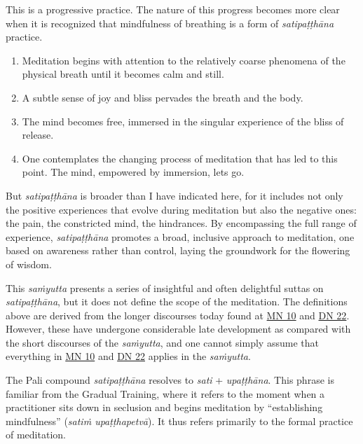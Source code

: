 \documentclass[12pt,openany]{book}%
\begin{document}
This is a progressive practice. The nature of this progress becomes more clear when it is recognized that mindfulness of breathing is a form of \textit{\textsanskrit{satipaṭṭhāna}} practice.

\begin{enumerate}%
\item Meditation begins with attention to the relatively coarse phenomena of the physical breath until it becomes calm and still.%
\item A subtle sense of joy and bliss pervades the breath and the body.%
\item The mind becomes free, immersed in the singular experience of the bliss of release.%
\item One contemplates the changing process of meditation that has led to this point. The mind, empowered by immersion, lets go.%
\end{enumerate}

But \textit{\textsanskrit{satipaṭṭhāna}} is broader than I have indicated here, for it includes not only the positive experiences that evolve during meditation but also the negative ones: the pain, the constricted mind, the hindrances. By encompassing the full range of experience, \textit{\textsanskrit{satipaṭṭhāna}} promotes a broad, inclusive approach to meditation, one based on awareness rather than control, laying the groundwork for the flowering of wisdom.

This \textit{\textsanskrit{saṁyutta}} presents a series of insightful and often delightful suttas on \textit{\textsanskrit{satipaṭṭhāna}}, but it does not define the scope of the meditation. The definitions above are derived from the longer discourses today found at \href{https://suttacentral.net/mn10}{MN 10} and \href{https://suttacentral.net/dn22}{DN 22}. However, these have undergone considerable late development as compared with the short discourses of the \textit{\textsanskrit{saṁyutta}}, and one cannot simply assume that everything in \href{https://suttacentral.net/mn10}{MN 10} and \href{https://suttacentral.net/dn22}{DN 22} applies in the \textit{\textsanskrit{saṁyutta}}.

The Pali compound \textit{\textsanskrit{satipaṭṭhāna}} resolves to \textit{sati} + \textit{\textsanskrit{upaṭṭhāna}}. This phrase is familiar from the Gradual Training, where it refers to the moment when a practitioner sits down in seclusion and begins meditation by “establishing mindfulness” (\textit{\textsanskrit{satiṁ} \textsanskrit{upaṭṭhapetvā}}). It thus refers primarily to the formal practice of meditation.
\end{document}
